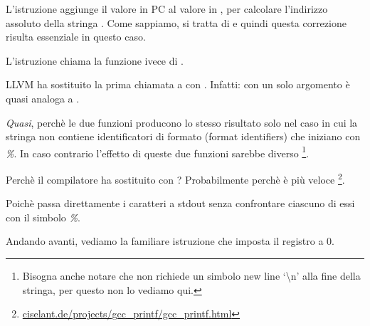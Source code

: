 L'istruzione  aggiunge il valore in \ac{PC} al valore in , per calcolare l'indirizzo assoluto della stringa .
Come sappiamo, si tratta di \q{\PICcode} e quindi questa correzione risulta essenziale in questo caso.

L'istruzione  chiama la funzione \puts ivece di \printf.

\label{puts}

LLVM ha sostituito la prima chiamata a \printf con \puts.
Infatti: \printf con un solo argomento è quasi analoga a \puts.

\emph{Quasi}, perchè le due funzioni producono lo stesso risultato solo nel caso in cui la stringa non contiene
identificatori di formato (format identifiers) che iniziano con \emph{\%}.
In caso contrario l'effetto di queste due funzioni sarebbe diverso
\footnote{Bisogna anche notare che \puts non richiede un simbolo new line `\textbackslash{}n' alla fine della stringa,
per questo non lo vediamo qui.}.

Perchè il compilatore ha sostituito \printf con \puts? Probabilmente perchè \puts è più veloce
\footnote{\href{http://www.ciselant.de/projects/gcc_printf/gcc_printf.html}{ciselant.de/projects/gcc\_printf/gcc\_printf.html}}.

Poichè passa direttamente i caratteri a \gls{stdout} senza confrontare ciascuno di essi con il simbolo \emph{\%}.

Andando avanti, vediamo la familiare istruzione  che imposta il registro  a 0.
